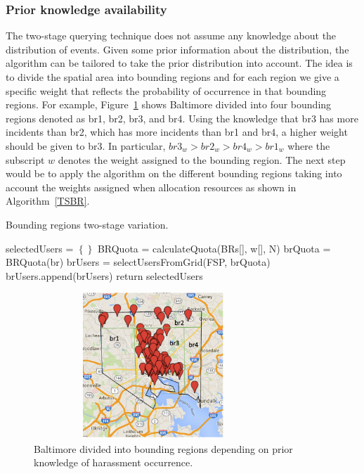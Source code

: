 \documentclass{acm_proc_article-sp}
\begin{document}
\subsubsection{Prior knowledge availability}
The two-stage querying technique does not assume any knowledge about the distribution of events. Given some prior information about the distribution, the algorithm can be tailored to take the prior distribution into account. The idea is to divide the spatial area into bounding regions and for each region we give a specific weight that reflects the probability of occurrence in that bounding regions.
For example, Figure~\ref{fig: BaltimoreRegions} shows Baltimore divided into four bounding regions denoted as br1, br2, br3, and br4. Using the knowledge that br3 has more incidents than br2, which has more incidents than br1 and br4, a higher weight should be given to br3. In particular, $br3_w > br2_w> br4_w> br1_w$ where the subscript $w$ denotes the weight assigned to the bounding region. The next step would be to apply the algorithm on the different bounding regions taking into account the weights assigned when allocation resources as shown in Algorithm~\ref{TSBR}.
\begin{algorithm}
\caption{Bounding regions two-stage variation.}
\label{TSBR}
 \begin{algorithmic}[1]
     \State selectedUsers = $\left\{\right\}$
      \State BRQuota = calculateQuota(BRs[], w[], N)
       \State brQuota = BRQuota(br)
     \State brUsers = selectUsersFromGrid(FSP, brQuota)
     \State brUsers.append(brUsers)
   \EndFor
\State return {selectedUsers}
\EndFunction
\end{algorithmic}
\end{algorithm}
\begin{figure}[!h]
\centering
\includegraphics[width=9cm ,height=5.5cm]{figuresPng/BaltimoreBr.png}
\caption{Baltimore divided into bounding regions depending on prior knowledge of harassment occurrence.}
\label{fig: BaltimoreRegions}
\end{figure}
\end{document}
